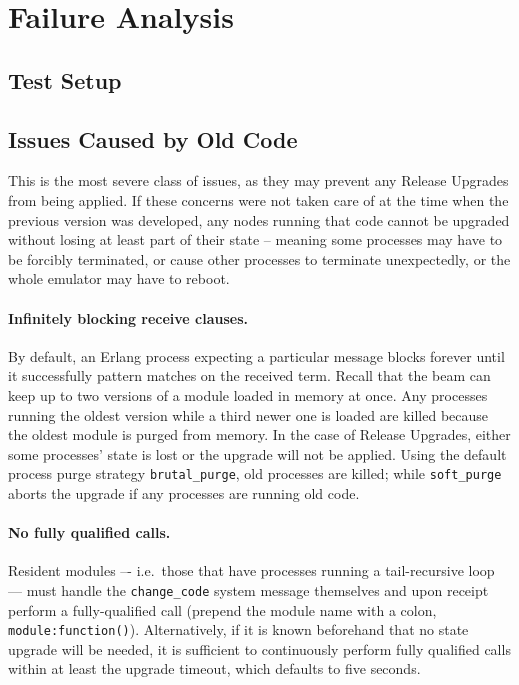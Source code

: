 \cleardoublepage
\section{Failure Analysis}


\subsection{Test Setup}


\subsection{Issues Caused by Old Code}

This is the most severe class of issues, as they may prevent any Release Upgrades from being applied. If these concerns were not taken care of at the time when the previous version was developed, any nodes running that code cannot be upgraded without losing at least part of their state -- meaning some processes may have to be forcibly terminated, or cause other processes to terminate unexpectedly, or the whole emulator may have to reboot.

\paragraph{Infinitely blocking receive clauses.}
By default, an Erlang process expecting a particular message blocks forever until it successfully pattern matches on the received term. Recall that the \acrshort{beam} can keep up to two versions of a module loaded in memory at once. Any processes running the oldest version while a third newer one is loaded are killed because the oldest module is purged from memory. In the case of Release Upgrades, either some processes' state is lost or the upgrade will not be applied. Using the default process purge strategy \lstinline|brutal_purge|, old processes are killed; while \lstinline|soft_purge| aborts the upgrade if any processes are running old code.

\paragraph{No fully qualified calls.}
Resident modules –- i.e.~those that have processes running a tail-recursive loop –– must handle the \lstinline|change_code| system message themselves and upon receipt perform a fully-qualified call (prepend the module name with a colon, \lstinline|module:function()|). Alternatively, if it is known beforehand that no state upgrade will be needed, it is sufficient to continuously perform fully qualified calls within at least the upgrade timeout, which defaults to five seconds.

